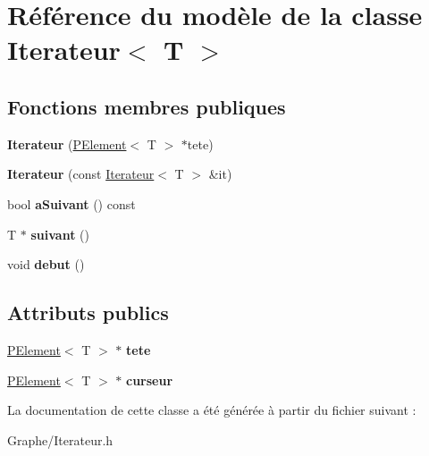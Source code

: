 \hypertarget{class_iterateur}{}\section{Référence du modèle de la classe Iterateur$<$ T $>$}
\label{class_iterateur}
\subsection*{Fonctions membres publiques}
\begin{DoxyCompactItemize}
\item 
\mbox{\label{class_iterateur_afe239cb16f4e9c0656c38ff0f721063a}} 
{\bfseries Iterateur} (\mbox{\hyperlink{class_p_element}{P\+Element}}$<$ T $>$ $\ast$tete)
\item 
\mbox{\label{class_iterateur_a364ad797d1c05c9191c06bc36ff2270e}} 
{\bfseries Iterateur} (const \mbox{\hyperlink{class_iterateur}{Iterateur}}$<$ T $>$ \&it)
\item 
\mbox{\label{class_iterateur_a35519ba11921986a2e49adea7dbcf4a7}} 
bool {\bfseries a\+Suivant} () const
\item 
\mbox{\label{class_iterateur_a7fa0d85bdc1eb61d41c3df434fff8763}} 
T $\ast$ {\bfseries suivant} ()
\item 
\mbox{\label{class_iterateur_a566ec911403a28c5f05e4e54b5a6b950}} 
void {\bfseries debut} ()
\end{DoxyCompactItemize}
\subsection*{Attributs publics}
\begin{DoxyCompactItemize}
\item 
\mbox{\label{class_iterateur_a0e9a34e34cf5cbb884975a6d4ea0a304}} 
\mbox{\hyperlink{class_p_element}{P\+Element}}$<$ T $>$ $\ast$ {\bfseries tete}
\item 
\mbox{\label{class_iterateur_aff6e4fac643dfa27e92401c935cb2d3c}} 
\mbox{\hyperlink{class_p_element}{P\+Element}}$<$ T $>$ $\ast$ {\bfseries curseur}
\end{DoxyCompactItemize}


La documentation de cette classe a été générée à partir du fichier suivant \+:\begin{DoxyCompactItemize}
\item 
Graphe/Iterateur.\+h\end{DoxyCompactItemize}
